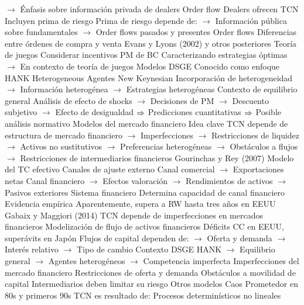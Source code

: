 \documentclass{nuevotema}
\begin{document}
\begin{esquemal}
				\4[] $\to$ Énfasis sobre información privada de dealers
			\3 Order flow
				\4 Dealers ofrecen TCN
				\4[] Incluyen prima de riesgo
				\4[] Prima de riesgo depende de:
				\4[] $\to$ Información pública sobre fundamentales
				\4[] $\to$ Order flows pasados y presentes
				\4 Order flows
				\4[] Diferencias entre órdenes de compra y venta
				\4 Evans y Lyons (2002) y otros posteriores
			\3 Teoría de juegos
				\4 Considerar incentivos PM de BC
				\4[] Caracterizando estrategias óptimas
				\4[] $\to$ En contexto de teoría de juegos
			\3 Modelos DSGE
				\4 Conocido como enfoque HANK
				\4[] Heterogeneous Agentes New Keynesian
				\4 Incorporación de heterogeneidad
				\4[] $\to$ Información heterogénea
				\4[] $\to$ Estrategias heterogéneas
				\4 Contexto de equilibrio general
				\4 Análisis de efecto de shocks
				\4[] $\to$ Decisiones de PM
				\4[] $\to$ Descuento subjetivo
				\4[] $\to$ Efecto de desigualdad
				\4[] $\Rightarrow$ Predicciones cuantitativas
				\4[] $\Rightarrow$ Posible análisis normativo
		\2 Modelos del mercado financiero
			\3 Idea clave
				\4 TCN depende de estructura de mercado financiero
				\4[] $\to$ Imperfecciones
				\4[] $\to$ Restricciones de liquidez
				\4[] $\to$ Activos no sustitutivos
				\4[] $\to$ Preferencias heterogéneas
				\4[] $\to$ Obstáculos a flujos
				\4[] $\to$ Restricciones de intermediarios financieros
			\3 Gourinchas y Rey (2007)
				\4 Modelo del TC efectivo
				\4 Canales de ajuste externo
				\4[] Canal comercial
				\4[] $\to$ Exportaciones netas
				\4[] Canal financiero
				\4[] $\to$ Efectos valoración
				\4[] $\to$ Rendimientos de activos
				\4[] $\to$ Pasivos exteriores
				\4 Sistema financiero
				\4[] Determina capacidad de canal financiero
				\4 Evidencia empírica
				\4[] Aparentemente, supera a RW hasta tres años en EEUU
			\3 Gabaix y Maggiori (2014)
				\4 TCN depende de imperfecciones en mercados financieros
				\4 Modelización de flujo de activos financieros
				\4[] Déficits CC en EEUU, superávits en Japón
				\4[] Flujos de capital dependen de:
				\4[] $\to$ Oferta y demanda
				\4[] $\to$ Interés relativo
				\4[] $\to$ Tipo de cambio
				\4[] Contexto DSGE HANK
				\4[] $\to$ Equilibrio general
				\4[] $\to$ Agentes heterogéneos
				\4[] $\to$ Competencia imperfecta
				\4 Imperfecciones del mercado financiero
				\4[] Restricciones de oferta y demanda
				\4[] Obstáculos a movilidad de capital
				\4[] Intermediarios deben limitar su riesgo
		\2 Otros modelos
			\3 Caos
				\4 Prometedor en 80s y primeros 90s
				\4 TCN es resultado de:
				\4[] Procesos determinísticos no lineales

\end{esquemal}
\end{document}
